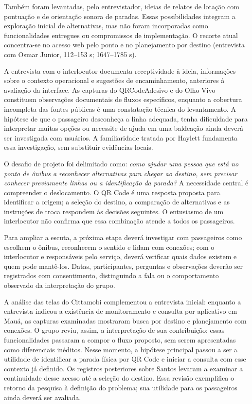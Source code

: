 \documentclass[12pt,oneside,a4paper,brazil,chapter=TITLE]{abntex2}
\begin{document}
Também foram levantadas, pelo entrevistador, ideias de relatos de lotação com pontuação e de orientação sonora de paradas. Essas possibilidades integram a exploração inicial de alternativas, mas não foram incorporadas como funcionalidades entregues ou compromissos de implementação. O recorte atual concentra-se no acesso web pelo ponto e no planejamento por destino  (entrevista com Osmar Junior, 112--153 s; 1647--1785 s).


A entrevista com o interlocutor documenta receptividade à ideia, informações sobre o contexto operacional e sugestões de encaminhamento, anteriores à avaliação da interface. As capturas do QRCodeAdesivo e do Olho Vivo constituem observações documentais de fluxos específicos, enquanto a cobertura incompleta das fontes públicas é uma constatação técnica do levantamento. A hipótese de que o passageiro desconheça a linha adequada, tenha dificuldade para interpretar muitas opções ou necessite de ajuda em uma baldeação ainda deverá ser investigada com usuários. A familiaridade tratada por Haylett fundamenta essa investigação, sem substituir evidências locais.

O desafio de projeto foi delimitado como: \textit{como ajudar uma pessoa que está no ponto de ônibus a reconhecer alternativas para chegar ao destino, sem precisar conhecer previamente linhas ou a identificação da parada?} A necessidade central é compreender o deslocamento. O QR Code é uma resposta proposta para identificar a origem; a seleção do destino, a comparação de alternativas e as instruções de troca respondem às decisões seguintes. O entusiasmo de um interlocutor não confirma que essa combinação atende a todos os passageiros.

Para ampliar a escuta, a próxima etapa deverá investigar com passageiros como escolhem o ônibus, reconhecem o sentido e lidam com conexões; com o interlocutor e responsáveis pelo serviço, deverá verificar quais dados existem e quem pode mantê-los. Datas, participantes, perguntas e observações deverão ser registrados com consentimento, distinguindo a fala ou o comportamento observado da interpretação do grupo.

A análise das telas do Cittamobi complementou a entrevista inicial: enquanto a entrevista indicou a existência de monitoramento e consulta por aplicativo em Mauá, as capturas examinadas mostraram busca por destino e planejamento com conexões. O grupo reviu, assim, a interpretação de sua contribuição: essas funcionalidades passaram a compor o fluxo proposto, sem serem apresentadas como diferenciais inéditos. Nesse momento, a hipótese principal passou a ser a utilidade de identificar a parada física por QR Code e iniciar a consulta com esse contexto já definido. Os registros posteriores sobre Santos levaram a examinar a continuidade desse acesso até a seleção do destino. Essa revisão exemplifica o retorno da pesquisa à definição do problema; sua utilidade para os passageiros ainda deverá ser avaliada.
\end{document}
